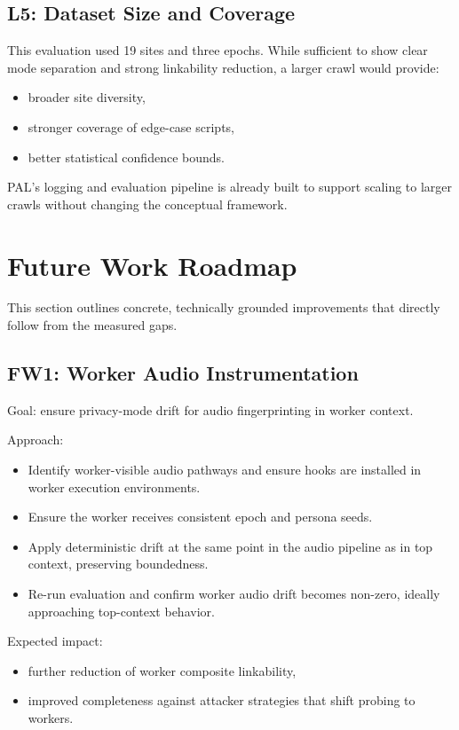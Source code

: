 \documentclass[11pt]{report}
\begin{document}
\subsection{L5: Dataset Size and Coverage}

This evaluation used 19 sites and three epochs. While sufficient to show clear mode separation and strong linkability reduction, a larger crawl would provide:

\begin{itemize}
    \item broader site diversity,
    \item stronger coverage of edge-case scripts,
    \item better statistical confidence bounds.
\end{itemize}

PAL’s logging and evaluation pipeline is already built to support scaling to larger crawls without changing the conceptual framework.

\section{Future Work Roadmap}

This section outlines concrete, technically grounded improvements that directly follow from the measured gaps.

\subsection{FW1: Worker Audio Instrumentation}

Goal: ensure privacy-mode drift for audio fingerprinting in worker context.

Approach:
\begin{itemize}
    \item Identify worker-visible audio pathways and ensure hooks are installed in worker execution environments.
    \item Ensure the worker receives consistent epoch and persona seeds.
    \item Apply deterministic drift at the same point in the audio pipeline as in top context, preserving boundedness.
    \item Re-run evaluation and confirm worker audio drift becomes non-zero, ideally approaching top-context behavior.
\end{itemize}

Expected impact:
\begin{itemize}
    \item further reduction of worker composite linkability,
    \item improved completeness against attacker strategies that shift probing to workers.
\end{itemize}
\end{document}
